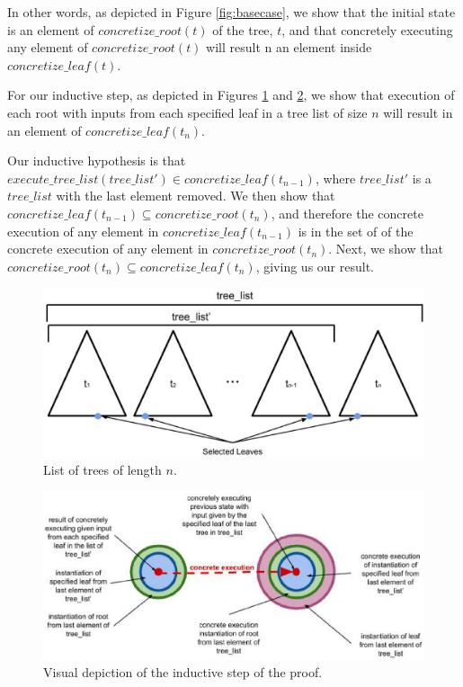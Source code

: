 In other words, as depicted in Figure \ref{fig:basecase}, we show that the initial state is an element of $concretize\_root(t)$ of the tree, $t$, and that concretely executing any element of $concretize\_root(t)$ will result n an element inside $concretize\_leaf(t).$



For our inductive step, as depicted in Figures  \ref{fig:tlist} and \ref{fig:indstep}, we show that execution of each root with inputs from each specified leaf in a tree list of size $n$ will result in an element of $concretize\_leaf(t_n)$.

Our inductive hypothesis is that $execute\_tree\_list (tree\_list') \in concretize\_leaf (t_{n-1})$, where $tree\_list'$ is a $tree\_list$ with the last element removed. We then show that $concretize\_leaf (t_{n-1}) \subseteq concretize\_root (t_{n}) $, and therefore the concrete execution of any element in $concretize\_leaf (t_{n-1}) $ is in the set of of the concrete execution of any element in $concretize\_root (t_{n})$. Next, we show that $concretize\_root (t_{n}) \subseteq concretize\_leaf (t_{n})$, giving us our result.
 
\begin{figure}
\centering
\includegraphics[width=.8\textwidth]{tlist.eps}
\caption{List of trees of length $n$.}
\label{fig:tlist}
\end{figure}

\begin{figure}
\centering
\includegraphics[width=.8\textwidth]{set4.eps}
\caption{Visual depiction of the inductive step of the proof.}
\label{fig:indstep}
\end{figure}
